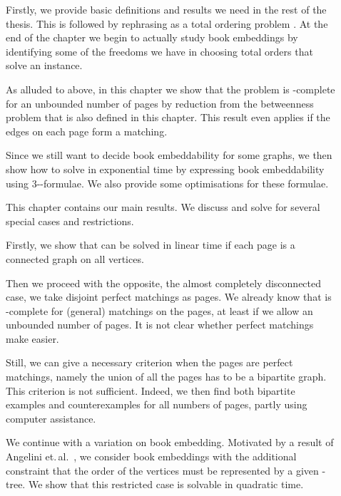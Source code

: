 \begin{description}
\item[] Firstly, we provide basic definitions and results
we need in the rest of the thesis. This is followed by rephrasing \probBook as a 
total ordering problem \probBookOrder. At the end of the chapter we begin to actually study book embeddings by identifying some of the freedoms we have in choosing total orders that solve an \probBookOrder instance. 
\item[] As alluded to above, in this chapter we show that the \probBook problem
is \NP-complete for an unbounded number of pages by reduction from the betweenness problem that is
also defined in this chapter. 
This result even applies if the edges on each page form a matching.

Since we still want to decide book embeddability for some graphs, we then show
how to solve \probBook in exponential time by expressing book embeddability using 3-\CNF-formulae. We also provide some optimisations for these formulae.
\item[] This chapter contains our main results. We discuss
and solve \probBook for several special cases and restrictions.

Firstly, we show that \probBook can be solved in linear time if each
page is a connected graph on all vertices. 

Then
we proceed with the opposite, the almost completely disconnected case, \ie we take disjoint perfect matchings as pages. We already
know that \probBook is \NP-complete for (general) matchings on the pages, at least if
we allow an unbounded number of pages. It is not clear whether perfect matchings make \probBook easier.

Still, we can give a necessary
criterion when the pages are perfect matchings, namely the union of all the pages has to be a bipartite graph. This criterion is not sufficient. Indeed, we then find both bipartite examples and counterexamples
for all numbers of pages, partly using computer assistance.

We continue with a variation on book embedding. Motivated by a result of Angelini et.\,al.~\cite{angelini11}, we consider book embeddings with the additional constraint that the
order of the vertices must be represented by a given \Q-tree. We show that this restricted case is
solvable in quadratic time.


\end{description}
